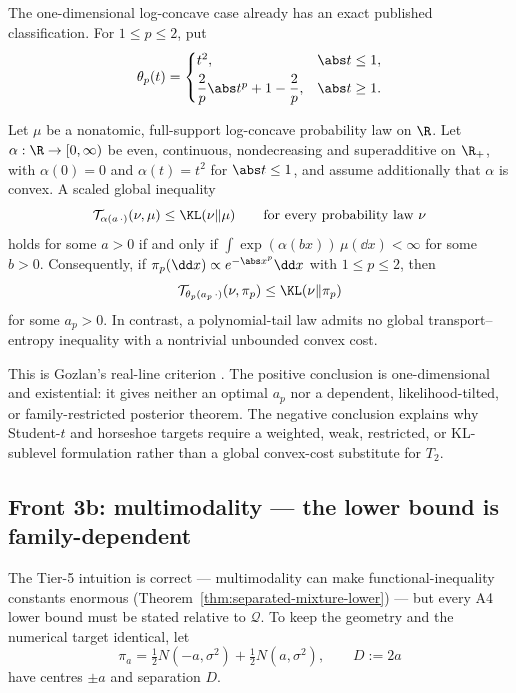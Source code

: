 \documentclass[../../main.tex]{subfiles}
\begin{document}
The one-dimensional log-concave case already has an exact published classification.  For
$1\le p\le2$, put
\[
 \theta_p(t)=
 \begin{cases}
 t^2,&\abs t\le1,\\[1mm]
 \dfrac{2}{p}\abs t^p+1-\dfrac{2}{p},&\abs t\ge1.
 \end{cases}
\]

\begin{theorem}
\label{thm:a4-modified-transport-1d}
Let $\mu$ be a nonatomic, full-support log-concave probability law on $\R$.  Let
$\alpha:\R\to[0,\infty)$ be even, continuous, nondecreasing and superadditive on $\R_+$, with
$\alpha(0)=0$ and $\alpha(t)=t^2$ for $\abs t\le1$, and assume additionally that $\alpha$ is
convex.  A scaled global inequality
\[
 \mathcal T_{\alpha(a\,\cdot)}(\nu,\mu)\le \KL(\nu\|\mu)
 \qquad\text{for every probability law }\nu
\]
holds for some $a>0$ if and only if
$\int\exp(\alpha(bx))\,\mu(\dd x)<\infty$ for some $b>0$.
Consequently, if $\pi_p(\dd x)\propto e^{-\abs x^p}\dd x$ with $1\le p\le2$, then
\[
 \mathcal T_{\theta_p(a_p\,\cdot)}(\nu,\pi_p)
 \le \KL(\nu\|\pi_p)
\]
for some $a_p>0$.  In contrast, a polynomial-tail law admits no global
transport--entropy inequality with a nontrivial unbounded convex cost.
\end{theorem}

\noindent This is Gozlan's real-line criterion \cite[Theorem~57 and
Propositions~16, 26]{Gozlan2007RealLine}.  The positive conclusion is one-dimensional and
existential: it gives neither an optimal $a_p$ nor a dependent, likelihood-tilted, or
family-restricted posterior theorem.  The negative conclusion explains why Student-$t$ and
horseshoe targets require a weighted, weak, restricted, or KL-sublevel formulation rather than
a global convex-cost substitute for $T_2$.

\subsection{Front 3b: multimodality --- the lower bound is family-dependent}
\label{subsec:a4-multimodal}

The Tier-5 intuition is correct --- multimodality can make functional-inequality constants enormous
(Theorem~\ref{thm:separated-mixture-lower}) --- but every A4 lower bound must be stated relative to
$\mathcal Q$. To keep the geometry and the numerical target identical, let
\[
 \pi_a=\tfrac12N(-a,\sigma^2)+\tfrac12N(a,\sigma^2),
 \qquad D:=2a
\]
have centres $\pm a$ and separation $D$.
\end{document}
